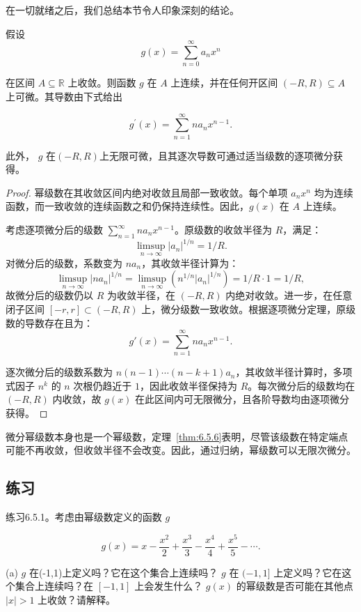 在一切就绪之后，我们总结本节令人印象深刻的结论。

\begin{Thm}
  \label{thm:6.5.7}
  假设
\[
g\left( x\right)  = \mathop{\sum }\limits_{{n = 0}}^{\infty }{a}_{n}{x}^{n}
\]

在区间 \(A \subseteq  \mathbb{R}\) 上收敛。则函数 \(g\) 在 \(A\) 上连续，并在任何开区间 \(\left( {-R,R}\right)  \subseteq  A\) 上可微。其导数由下式给出

\[
{g}^{\prime }\left( x\right)  = \mathop{\sum }\limits_{{n = 1}}^{\infty }n{a}_{n}{x}^{n - 1}.
\]

此外， \(g\) 在$(-R, R)$上无限可微，且其逐次导数可通过适当级数的逐项微分获得。
\end{Thm}

\begin{proof}
幂级数在其收敛区间内绝对收敛且局部一致收敛。每个单项 \(a_n x^n\) 均为连续函数，而一致收敛的连续函数之和仍保持连续性。因此，\(g(x)\) 在 \(A\) 上连续。

考虑逐项微分后的级数 \(\sum_{n=1}^{\infty} n a_n x^{n-1}\)。原级数的收敛半径为 \(R\)，满足：
\[
\limsup_{n→∞} |a_n|^{1/n} = 1/R.
\]
对微分后的级数，系数变为 \(n a_n\)，其收敛半径计算为：
\[
\limsup_{n→∞} |n a_n|^{1/n} = \limsup_{n→∞} \left( n^{1/n} |a_n|^{1/n} \right) = 1/R \cdot 1 = 1/R,
\]
故微分后的级数仍以 \(R\) 为收敛半径，在 \((-R, R)\) 内绝对收敛。进一步，在任意闭子区间 \([-r, r] \subset (-R, R)\) 上，微分级数一致收敛。根据逐项微分定理，原级数的导数存在且为：
\[
g'(x) = \sum_{n=1}^{\infty} n a_n x^{n-1}.
\]

逐次微分后的级数系数为 \(n(n-1)\cdots(n-k+1) a_n\)，其收敛半径计算时，多项式因子 \(n^k\) 的 \(n\) 次根仍趋近于 $1$，因此收敛半径保持为 \(R\)。每次微分后的级数均在 \((-R, R)\) 内收敛，故 \(g(x)\) 在此区间内可无限微分，且各阶导数均由逐项微分获得。
\end{proof}

微分幂级数本身也是一个幂级数，定理~\ref{thm:6.5.6}表明，尽管该级数在特定端点可能不再收敛，但收敛半径不会改变。因此，通过归纳，幂级数可以无限次微分。

\subsection{练习}

练习6.5.1。考虑由幂级数定义的函数 \(g\)

\[
g\left( x\right)  = x - \frac{{x}^{2}}{2} + \frac{{x}^{3}}{3} - \frac{{x}^{4}}{4} + \frac{{x}^{5}}{5} - \cdots .
\]

(a) \(g\) 在(-1,1)上定义吗？它在这个集合上连续吗？ \(g\) 在 \(( - 1,1\rbrack\) 上定义吗？它在这个集合上连续吗？在 \(\left\lbrack  {-1,1}\right\rbrack\) 上会发生什么？ \(g\left( x\right)\) 的幂级数是否可能在其他点 \(\left| x\right|  > 1\) 上收敛？请解释。


